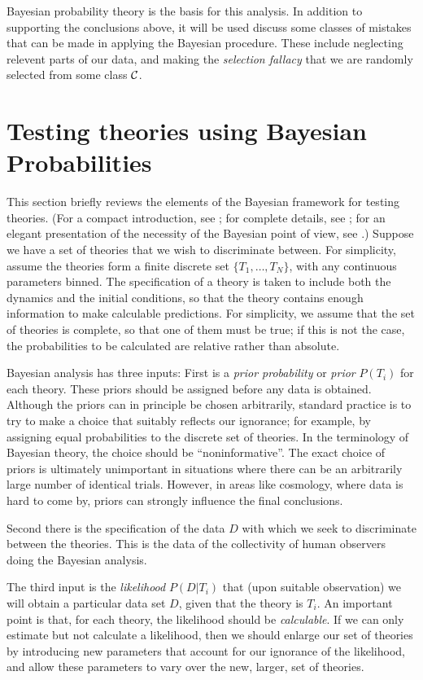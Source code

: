 \documentclass[pra,twocolumn,nofootinbib,eqsecnum,floatfix]{revtex4}
\begin{document}
Bayesian probability theory is the basis for this analysis.  
In addition to supporting the conclusions above, it will be used  discuss some classes of mistakes that can be made in applying the Bayesian procedure. These include neglecting relevent parts of our data, and making the {\em selection fallacy} that we are randomly selected from some class $\cal C$. 

\section{Testing theories using Bayesian Probabilities}

This section briefly reviews the elements of the Bayesian framework for testing theories. 
(For a compact introduction,
see \cite{Sred05}; for complete details, see \cite{Jaynes}; for an elegant presentation of the 
necessity of the Bayesian point of view, see \cite{App04}.)  Suppose we have a set of theories that we wish to discriminate between.  For simplicity, assume the theories  form a finite discrete set
$\{T_1,  \ldots, T_N\}$, with any continuous parameters binned.   The specification of a theory is taken to include both the dynamics and the initial conditions, so that the theory contains enough information to make calculable predictions.   For simplicity, we assume that the set of theories
is complete, so that one of them must be true; if this is not the case,
the probabilities to be calculated are relative rather than absolute.  

Bayesian analysis has three inputs:  First is a {\it prior probability\/} or {\it prior\/}
$P(T_i)$ for each theory.  These priors should be assigned before any data is obtained.  
Although the priors can in principle be chosen arbitrarily, standard practice is to try to make 
a choice that  suitably reflects our ignorance; for example, by assigning equal probabilities to the discrete set of theories. In the terminology of Bayesian theory, the choice should be ``noninformative''.  
The exact choice of priors is ultimately unimportant in situations where there can be an arbitrarily large number of identical trials. However, in areas like cosmology, where data is hard to come by, priors can strongly influence the final conclusions.  

Second there  is the specification of the data $D$ with which we seek to discriminate between the theories. This is the data of the collectivity of human observers doing the Bayesian analysis. 

The third input  is the {\it likelihood\/} $P(D|T_i)$ that (upon suitable observation) we will
obtain a particular data set $D$, given that the theory is $T_i$.  
An important point is that, for each theory, the likelihood
should be {\it calculable}.  If we can only estimate but not calculate a likelihood, then we should enlarge our set of theories by introducing new parameters that account for our ignorance of the
likelihood, and allow these parameters to vary over the new, larger, set of theories.  
\end{document}
